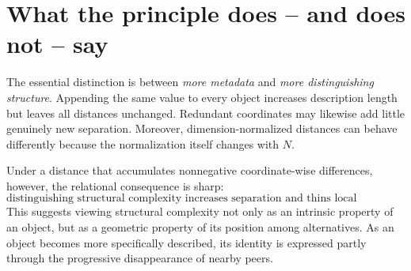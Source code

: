 \documentclass[10.5pt]{article}
\begin{document}
\section*{What the principle does -- and does not -- say}
The essential distinction is between \emph{more metadata} and \emph{more distinguishing structure}. Appending the same value to every object increases description length but leaves all distances unchanged. Redundant coordinates may likewise add little genuinely new separation. Moreover, dimension-normalized distances can behave differently because the normalization itself changes with $N$.

Under a distance that accumulates nonnegative coordinate-wise differences, however, the relational consequence is sharp:
\[
\boxed{
\text{distinguishing structural complexity increases separation and thins local neighborhoods.}
}
\]
This suggests viewing structural complexity not only as an intrinsic property of an object, but as a geometric property of its position among alternatives. As an object becomes more specifically described, its identity is expressed partly through the progressive disappearance of nearby peers.
\end{document}
